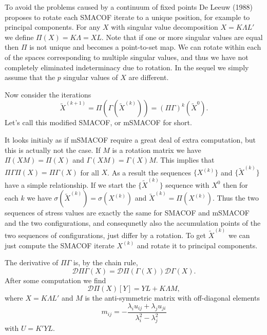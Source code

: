 \documentclass[
  12pt,
]{article}
\begin{document}
To avoid the problems caused by a continuum of fixed points De Leeuw (1988) proposes to rotate each SMACOF iterate to a unique position, for example to principal components.
For any \(X\) with singular value decomposition \(X=K\Lambda L'\) we define \(\Pi(X)=K\Lambda=XL.\) Note that if one or more singular values are equal then
\(\Pi\) is not unique and becomes a point-to-set map. We can rotate within each of the spaces corresponding to multiple singular values, and thus we have not completely eliminated indeterminacy due to rotation. In the sequel we simply assume that the \(p\) singular values of \(X\) are different.

Now consider the iterations
\begin{equation}
\tilde X^{(k+1)}=\Pi(\Gamma(\tilde X^{(k)}))={(\Pi\Gamma)}^k(\tilde X^{0}).
\end{equation}
Let's call this modified SMACOF, or mSMACOF for short.

It looks initialy as if mSMACOF require a great deal of extra computation, but this is actually not the case. If \(M\) is a rotation matrix we have \(\Pi(XM)=\Pi(X)\) and \(\Gamma(XM)=\Gamma(X)M\). This implies that \(\Pi\Gamma\Pi(X)=\Pi\Gamma(X)\) for all \(X\). As a result the sequences \(\{X^{(k)}\}\) and \(\{\tilde X^{(k)}\}\) have a simple relationship. If we start the \(\{\tilde X^{(k)}\}\) sequence with \(X^{0}\) then for each \(k\) we have \(\sigma(\tilde X^{(k)})=\sigma(X^{(k)})\) and \(\tilde X^{(k)}=\Pi(X^{(k)})\). Thus the
two sequences of stress values are exactly the same for SMACOF and mSMACOF and the two configurations, and consequnetly also the accumulation points of the two sequences of configurations, just differ by a rotation. To get \(\tilde X^{(k)}\) we can just compute the SMACOF iterate \(X^{(k)}\) and rotate it to principal components.

The derivative of \(\Pi\Gamma\) is, by the chain rule,
\begin{equation}
\mathcal{D}\Pi\Gamma(X)=\mathcal{D}\Pi(\Gamma(X))\mathcal{D}\Gamma(X).
\end{equation}
After some computation we find
\begin{equation}
\mathcal{D}\Pi(X)[Y]=YL+K\Lambda M,
\end{equation}
where \(X=K\Lambda L'\) and \(M\) is the anti-symmetric matrix with off-diagonal elements
\begin{equation}
m_{ij}=-\frac{\lambda_iu_{ij}+\lambda_ju_{ji}}{\lambda_i^2-\lambda_j^2}
\end{equation}
with \(U=K'YL\).
\end{document}
